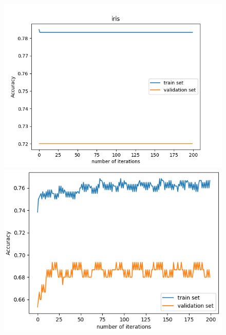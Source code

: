 \documentclass[11pt]{scrartcl}
\begin{document}
\begin{figure}[H]
	\centering
	\begin{minipage}{0.8\linewidth}
		\begin{minipage}[b]{0.48\linewidth}
		  \centering
		  \includegraphics[width= 1.02\linewidth]{fig/iris-lr0001.png}
		\end{minipage}
		\hfill
		\begin{minipage}[b]{0.48\linewidth}
		  \centering			
		  \includegraphics[width= \linewidth]{fig/iris-lr-001.png}
		\end{minipage}
		\begin{minipage}[b]{0.48\linewidth}
			\centering

\end{minipage}
\end{minipage}
\end{figure}
\end{document}
